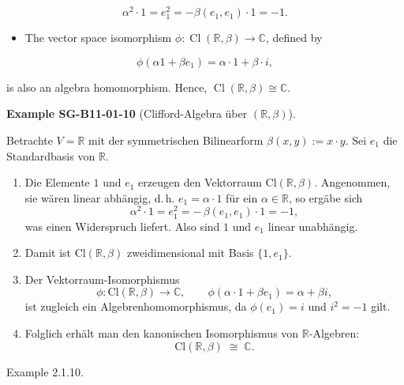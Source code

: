 \documentclass[10pt, letterpaper]{article}
\newcommand{\Cl}{\mathrm{Cl}}
\newcommand{\CustomHeading}[3]{%
  \par\medskip\noindent%
  \textbf{#1 #2} \textnormal{(#3)}.\enskip%
}
\newenvironment{EXA}[2]{\begin{unitbox}\CustomHeading{Example}{#1}{#2}}{\end{unitbox}}
\begin{document}
$$
\alpha^{2} \cdot 1=e_{1}^{2}=-\beta\left(e_{1}, e_{1}\right) \cdot 1=-1 .
$$

\begin{itemize}
  \item The vector space isomorphism $\phi: \operatorname{Cl}(\mathbb{R}, \beta) \rightarrow \mathbb{C}$, defined by
\end{itemize}

$$
\phi\left(\alpha 1+\beta e_{1}\right)=\alpha \cdot 1+\beta \cdot i,
$$

is also an algebra homomorphism. Hence, $\operatorname{Cl}(\mathbb{R}, \beta) \cong \mathbb{C}$.


\begin{EXA}{SG-B11-01-10}{Clifford-Algebra über $(\mathbb{R},\beta)$}
Betrachte $V=\mathbb{R}$ mit der symmetrischen Bilinearform $\beta(x,y):=x\cdot y$.  
Sei $e_{1}$ die Standardbasis von $\mathbb{R}$.

\begin{enumerate}
\item Die Elemente $1$ und $e_{1}$ erzeugen den Vektorraum $\Cl(\mathbb{R},\beta)$.
Angenommen, sie wären linear abhängig, d.\,h. $e_{1}=\alpha\cdot 1$ für ein $\alpha\in\mathbb{R}$, so ergäbe sich
\[
\alpha^{2}\cdot 1 = e_{1}^{2} = -\,\beta(e_{1},e_{1})\cdot 1 = -1,
\]
was einen Widerspruch liefert. Also sind $1$ und $e_{1}$ linear unabhängig.

\item Damit ist $\Cl(\mathbb{R},\beta)$ zweidimensional mit Basis $\{1,e_{1}\}$.

\item Der Vektorraum-Isomorphismus
\[
\phi:\Cl(\mathbb{R},\beta)\longrightarrow\mathbb{C}, \qquad
\phi(\alpha\cdot 1+\beta e_{1})=\alpha+\beta i,
\]
ist zugleich ein Algebrenhomomorphismus, da $\phi(e_{1})=i$ und $i^{2}=-1$ gilt.

\item Folglich erhält man den kanonischen Isomorphismus von $\mathbb{R}$-Algebren:
\[
\Cl(\mathbb{R},\beta)\;\cong\;\mathbb{C}.
\]
\end{enumerate}
\end{EXA}


Example 2.1.10. 
\end{document}

